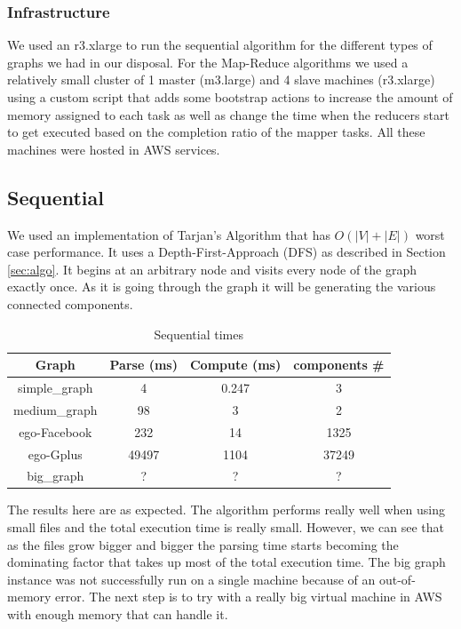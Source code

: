 \subsubsection{Infrastructure}

We used an r3.xlarge to run the sequential algorithm for the different types of graphs we had in our disposal. For the Map-Reduce algorithms we used a relatively small cluster of 1 master (m3.large) and 4 slave machines (r3.xlarge) using a custom script that adds some bootstrap actions to increase the amount of memory assigned to each task as well as change the time when the reducers start to get executed based on the completion ratio of the mapper tasks. All these machines were hosted in AWS services.


\subsection{Sequential}
We used an implementation of Tarjan's Algorithm that has $O(|V| + |E|)$ worst case performance. It uses a Depth-First-Approach (DFS) as described in Section \ref{sec:algo}. It begins at an arbitrary node and  visits every node of the graph exactly once. As it is going through the graph it will be generating the various connected components.

\begin{table}[!h]
\scriptsize
\begin{center}
\begin{tabular}{|c|c|c|c|}
\hline
{\bf Graph} & {\bf Parse (ms)} & {\bf Compute (ms)} & {\bf components \#} \\
\hline
\hline
simple\_graph   & 4  & 0.247 & 3 \\
\hline
medium\_graph   & 98  & 3 & 2 \\
\hline
ego-Facebook   & 232 & 14 & 1325  \\
\hline
ego-Gplus   & 49497 & 1104 & 37249 \\
\hline
big\_graph   & ?  & ? & ?  \\
\hline
\end{tabular}
\caption{Sequential times}
\label{tb:sequentialtimes}
\end{center}
\end{table}

The results here are as expected. The algorithm performs really well when using small files and the total execution time is really small. However, we can see that as the files grow bigger and bigger the parsing time starts becoming the dominating factor that takes up most of the total execution time. The big graph instance was not successfully run on a single machine because of an out-of-memory error. The next step is to try with a really big virtual machine in AWS with enough memory that can handle it.

